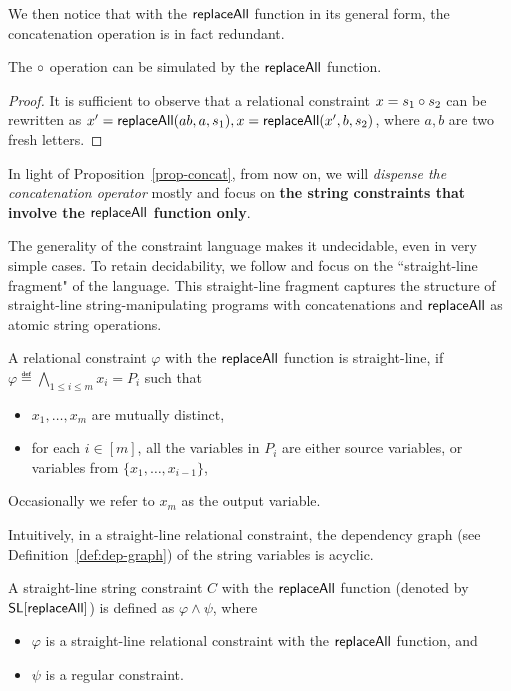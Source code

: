 We then notice that with the $\mathsf{replaceAll}$ function in its general form, the concatenation operation is in fact redundant.

\begin{proposition}\label{prop-concat}
	The $\circ$ operation can be simulated  by the $\mathsf{replaceAll}$ function.
\end{proposition}
\begin{proof}
	It is sufficient to observe that %
	a relational constraint $x = s_1 \circ s_2$ can be rewritten as $x' = \mathsf{replaceAll}(ab, a, s_1), x = \mathsf{replaceAll}(x', b, s_2)$, where $a,b$ are two fresh letters.
\end{proof}

In light of Proposition~\ref{prop-concat}, from now on, we will \emph{dispense the concatenation operator} mostly and focus on \textbf{the string constraints that involve  the $\mathsf{replaceAll}$ function only}.


\medskip

The generality of the constraint language makes it undecidable,
even in very simple cases. To retain decidability, we follow \cite{LB16} and focus on the ``straight-line fragment" of the language. This straight-line fragment captures the structure of straight-line string-manipulating
programs with concatenations and $\mathsf{replaceAll}$ as atomic string operations.  

\begin{definition}
	A relational constraint $ \varphi$ with the $\mathsf{replaceAll}$ function is straight-line, if $\varphi \eqdef \bigwedge \limits_{1 \le i \le m} x_i = P_i$ such that
	\begin{itemize}
		\item $x_1,\dots, x_m$ are mutually distinct,
		\item for each $i \in [m]$, all the variables in $P_i$ are either source variables, or variables from $\{x_1,\dots, x_{i-1}\}$,
	\end{itemize}
Occasionally we refer to $x_m$ as the output variable. 
\end{definition}
Intuitively, in a straight-line relational constraint, the dependency graph (see Definition~\ref{def:dep-graph}) of the string variables is acyclic.



\begin{definition}
	A straight-line string constraint $C$ with the $\mathsf{replaceAll}$ function (denoted by $\mathsf{SL}[\mathsf{replaceAll}]$)  is defined as $ \varphi \wedge \psi$,  where 
	\begin{itemize}
		\item $\varphi$ is a straight-line relational constraint with the $\mathsf{replaceAll}$ function,  and
		\item $\psi$ is a regular constraint.
	\end{itemize}
\end{definition}

